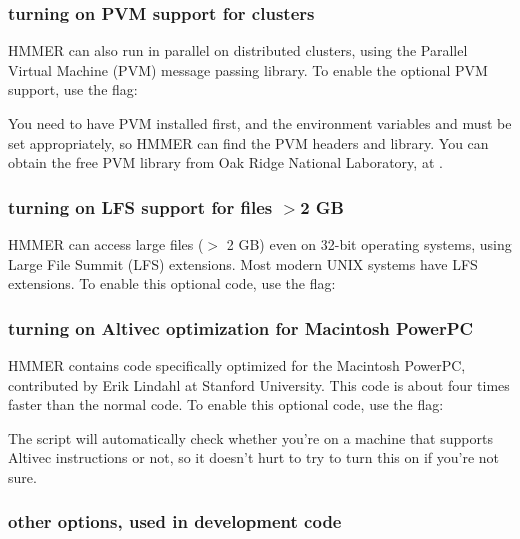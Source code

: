 \subsubsection{turning on PVM support for clusters}

HMMER can also run in parallel on distributed clusters, using the
Parallel Virtual Machine (PVM) message passing library.  To enable
the optional PVM support, use the  flag:


You need to have PVM installed first, and the environment variables
 and  must be set appropriately, so
HMMER can find the PVM headers and library.  You can obtain the free
PVM library from Oak Ridge National Laboratory, at
.

\subsubsection{turning on LFS support for files $>$2 GB}

HMMER can access large files ($>$ 2 GB) even on 32-bit operating
systems, using Large File Summit (LFS) extensions.  Most modern UNIX
systems have LFS extensions. To enable this optional code, use the
 flag:


\subsubsection{turning on Altivec optimization for Macintosh PowerPC}

HMMER contains code specifically optimized for the Macintosh PowerPC,
contributed by Erik Lindahl at Stanford University. This code is about
four times faster than the normal code. To enable this optional code,
use the  flag:


The  script will automatically check whether you're on
a machine that supports Altivec instructions or not, so it doesn't
hurt to try to turn this on if you're not sure.

\subsubsection{other options, used in development code}

